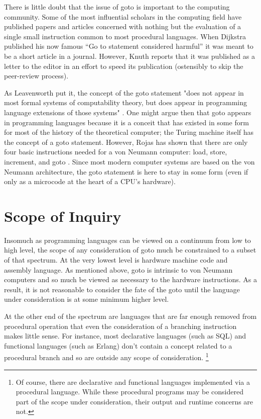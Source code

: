 \documentclass[letterpaper,12pt]{article}
\begin{document}
There is little doubt that the issue of goto is important to the computing community.
Some of the most influential scholars in the computing field have published
papers and articles concerned with nothing but the evaluation of a single small
instruction common to most procedural languages.
When Dijkstra published his now famous ``Go to statement considered harmful''
\cite{dijkstra} it was meant to be a short article in a journal.  However, Knuth
reports that it was published as a letter to the editor in an effort to speed
its publication \cite{knuth} (ostensibly to skip the peer-review process).

As Leavenworth put it,
the concept of the goto statement "does not appear in most formal systems of
computability theory, but does appear in programming language extensions of those
systems" \cite{leavenworth}.  One might argue then that goto appears in programming
languages because it is a conceit that has existed in some form for most of the
history of the theoretical computer; the Turing machine itself has the concept of
a goto statement.
\label{goto_von_neumann} However, Rojas has shown that there are only four
basic instructions needed for a von Neumann computer: load, store, increment,
and goto \cite{rojas}.  Since most modern computer systems are based on the
von Neumann architecture, the goto statement is here to stay in some form (even
if only as a microcode at the heart of a CPU's hardware).

\section{Scope of Inquiry}

Insomuch as programming languages can be viewed on a continuum from low to high
level, the scope of any consideration of goto much be constrained to a subset
of that spectrum.  At the very lowest level is hardware machine code and assembly
language.  As mentioned above, goto is intrinsic to von Neumann computers and so
much be viewed as necessary to the hardware instructions.  As a result, it is
not reasonable to consider the fate of the goto until the language under
consideration is at some minimum higher level.

At the other end of the spectrum are languages that are far enough removed
from procedural operation that even the consideration of a branching instruction
makes little sense.  For instance, most declarative languages (such as SQL) and
functional languages (such as Erlang) don't contain a concept related to a
procedural branch and so are outside any scope of consideration.
\footnote{Of course, there are declarative and functional languages implemented
via a procedural language.  While these procedural programs may be considered
part of the scope under consideration, their output and runtime concerns are
not. }
\end{document}
